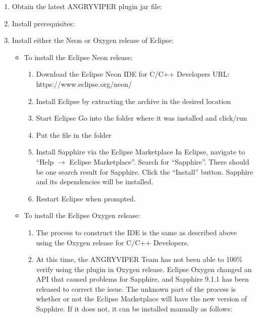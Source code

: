 \begin{enumerate}
\item Obtain the latest ANGRYVIPER plugin jar file:\\
\item Install prerequisites: \\
\item Install either the Neon or Oxygen release of Eclipse:
\begin{itemize}
\item To install the Eclipse Neon release:
\begin{enumerate}
\item Download the Eclipse Neon IDE for C/C++ Developers
\subitem URL: https://www.eclipse.org/neon/
\item Install Eclipse by extracting the archive in the desired location
\item Start Eclipse
\subitem Go into the folder where it was installed and click/run 
\item Put the  file in the  folder
\item Install Sapphire via the Eclipse Marketplace
\subitem In Eclipse, navigate to ``Help $\rightarrow$ Eclipse Marketplace''. Search for ``Sapphire''. There should be one search result for Sapphire.
Click the ``Install'' button.  Sapphire and its dependencies will be installed.
\item Restart Eclipse when prompted.
\end{enumerate} %

\item To install the Eclipse Oxygen release:
\begin{enumerate}
\item The process to construct the IDE is the same as described above using the Oxygen release for C/C++ Developers.

\item At this time, the ANGRYVIPER Team has not been able to 100\% verify using the plugin in Oxygen release. Eclipse Oxygen changed an API that caused problems for Sapphire, and Sapphire 9.1.1 has been released to correct the issue. The unknown part of the process is whether or not the Eclipse Marketplace will have the new version of Sapphire. If it does not, it can be installed manually as follows:


\end{enumerate}
\end{itemize}
\end{enumerate}
